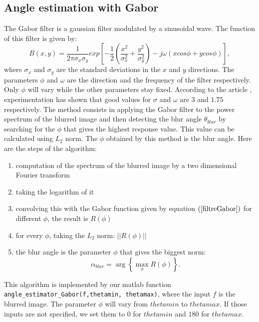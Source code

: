 \subsection{Angle estimation with Gabor}
\label{subsec:Gabor}
The Gabor filter is a gaussian filter modulated by a sinusoidal wave. The function of this filter is given by:
\begin{equation}
B(x,y)=\dfrac{1}{2\pi \sigma_x \sigma_y} exp\left[-\frac{1}{2}\left(\frac{x^2}{\sigma_x^2}+ \frac{y^2}{\sigma_y^2} \right) -j\omega(xcos\phi + ycos\phi)\right],
\label{filtreGabor}
\end{equation}
where $\sigma_x$ and $\sigma_y$ are the standard deviations in the $x$ and $y$ directions. The parameters $\phi$ and $\omega$ are the direction and the frequency of the filter respectively. Only $\phi$ will vary while the other parameters stay fixed. According to the article \cite{Dash20141634}, experimentation has shown that good values for $\sigma$ and $\omega$ are $3$ and $1.75$ respectively. The method consists in applying the Gabor filter to the power spectrum of the blurred image and then detecting the blur angle $\theta_{blur}$ by searching for the $\phi$ that gives the highest response value. This value can be calculated using $L_2$ norm. The $\phi$ obtained by this method is the blur angle. Here are the steps of the algorithm:
\begin{enumerate}
\item computation of the spectrum of the blurred image by a two dimensional Fourier transform
\item taking the logarithm of it
\item convolving this with the Gabor function given by equation $(\ref{filtreGabor})$ for different $\phi$, the result is $R(\phi)$
\item for every $\phi$, taking the $L_2$ norm: $||R(\phi)||$
\item the blur angle is the parameter $\phi$ that gives the biggest norm:
\begin{equation}
\alpha_{blur} = \arg \left\lbrace \max_{\phi}R(\phi)\right\rbrace.
\end{equation}
\end{enumerate}

This algorithm is implemented by our matlab function \texttt{angle\_estimator\_Gabor(f,thetamin, thetamax)}, where the input $f$ is the blurred image. The parameter $\phi$ will vary from $thetamin$ to $thetamax$. If those inputs are not specified, we set them to $0$ for $thetamin$ and $180$ for $thetamax$.


